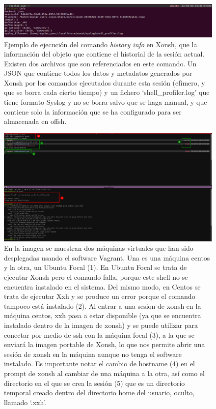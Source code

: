 \begin{figure}[pbth]
  \centering
  \includegraphics[width=\textwidth]{imagenes/historyinfo.png}
  \caption{Ejemplo de ejecución del comando \textit{history info} en Xonsh, que la información del objeto que contiene el historial de la sesión actual. Existen dos archivos que son referenciados en este comando. Un JSON que contiene todos los datos y metadatos generados por Xonsh por los comandos ejecutados durante esta sesión (efímero, y que se borra cada cierto tiempo) y un fichero `shell\_profiler.log' que tiene formato Syslog y no se borra salvo que se haga manual, y que contiene solo la información que se ha configurado para ser almacenada en offsh.}
  \label{xonsh_history}
\end{figure}

\begin{figure}[phbt]
  \centering
  \includegraphics[width=\textwidth]{imagenes/examplexxh.png}
  \caption{En la imagen se muestran dos máquinas virtuales que han sido desplegadas usando el software Vagrant. Una es una máquina centos y la otra, un Ubuntu Focal (1). En Ubuntu Focal se trata de ejecutar Xonsh pero el comando falla, porque este shell no se encuentra instalado en el sistema. Del mismo modo, en Centos se trata de ejecutar Xxh y se produce un error porque el comando tampoco está instalado (2). Al entrar a una sesion de xonsh en la máquina centos, xxh pasa a estar disponible (ya que se encuentra instalado dentro de la imagen de xonsh) y se puede utilizar para conectar por medio de ssh con la máquina focal (3), a la que se enviará la imagen portable de Xonsh, lo que nos permite abrir una sesión de xonsh en la máquina aunque no tenga el software instalado. Es importante notar el cambio de hostname (4) en el prompt de xonsh al cambiar de una máquina a la otra, así como el directorio en el que se crea la sesión (5) que es un directorio temporal creado dentro del directorio home del usuario, oculto, llamado `.xxh'.}
  \label{xxhexample}
\end{figure}

